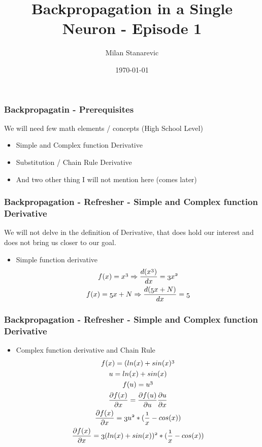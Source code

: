 \documentclass{beamer}
\title{Backpropagation in a Single Neuron - Episode 1}
\author{Milan Stanarevic}
\date{\today}
\newcommand{\var}[1]{\mathnormal{#1}}
\begin{document}
\begin{frame}
  \titlepage
\end{frame}

\begin{frame}
  \frametitle{Backpropagatin - Prerequisites}
  We will need few math elements / concepts (High School Level)
  \begin{itemize}
    \item Simple and Complex function Derivative
    \item Substitution / Chain Rule Derivative
    \item And two other thing I will not mention here (comes later)
  \end{itemize}
\end{frame}

\begin{frame}
  \frametitle{Backpropagation - Refresher - Simple and Complex function Derivative}
  We will not delve in the definition of Derivative, that does hold our interest and does not bring us closer to our goal.
  \vspace{0.5cm}
  \begin{itemize}
    \item Simple function derivative
      \begin{gather}
        \var{f(x) = x^3 \Rightarrow \frac{d(x^3)}{dx} = 3x^2} \\
        \var{f(x) = 5x+N \Rightarrow \frac{d(5x+N)}{dx} = 5}
      \end{gather}
  \end{itemize}
\end{frame}

\begin{frame}
  \frametitle{Backpropagation - Refresher - Simple and Complex function Derivative}
  \begin{itemize}
    \item Complex function derivative and Chain Rule
      \begin{gather}
        \var{f(x) = (ln(x) + sin(x)^3} \\
        \var{u = ln(x) + sin(x)} \\
        \var{f(u) = u^3} \\
        \var{\frac{\partial f(x)}{\partial x} = \frac{\partial f(u)}{\partial u} \frac{\partial u}{\partial x}} \\
        \var{\frac{\partial f(x)}{\partial x} = 3u^2 * (\frac{1}{x} - cos(x))} \\
        \var{\frac{\partial f(x)}{\partial x} = 3(ln(x) + sin(x))^2 * (\frac{1}{x} - cos(x))}
      \end{gather}
  \end{itemize}
\end{frame}
\end{document}
